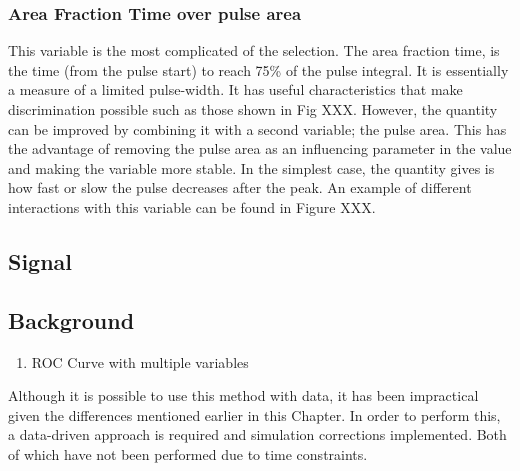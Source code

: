 \subsubsection{Area Fraction Time over pulse area}
This variable is the most complicated of the selection.
The area fraction time, is the time (from the pulse start) to reach 75\% of the pulse integral.
It is essentially a measure of a limited pulse-width.
It has useful characteristics that make discrimination possible such as those shown in Fig XXX.
However, the quantity can be improved by combining it with a second variable; the pulse area.
This has the advantage of removing the pulse area as an influencing parameter in the value and making the variable more stable.
In the simplest case, the quantity gives is how fast or slow the pulse decreases after the peak.
An example of different interactions with this variable can be found in Figure XXX.

\subsection{Signal}

\subsection{Background}


\begin{tcolorbox}[colback=red!5!white, colframe=red!50!black, title=Key Plots]
\begin{enumerate}
    \item ROC Curve with multiple variables
\end{enumerate}
\end{tcolorbox}

\par
Although it is possible to use this method with data, it has been impractical given the differences mentioned earlier in this Chapter.
In order to perform this, a data-driven approach is required and simulation corrections implemented.
Both of which have not been performed due to time constraints.
